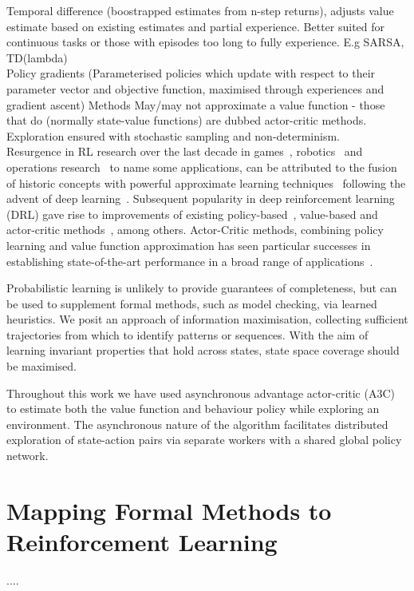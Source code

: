 \documentclass[conference,compsoc]{IEEEtran}
\begin{document}
Temporal difference (boostrapped estimates from n-step returns), adjusts value estimate based on existing estimates and partial experience. Better suited for continuous tasks or those with episodes too long to fully experience. 
E.g SARSA, TD(lambda)\\

Policy gradients (Parameterised policies which update with respect to their parameter vector and objective function, maximised through experiences and gradient ascent)
Methods May/may not approximate a value function - those that do (normally state-value functions) are dubbed actor-critic methods. Exploration ensured with stochastic sampling and non-determinism.\\


Resurgence in RL research over the last decade in games~\cite{schaul2015prioritized, silver2016mastering, vinyals2019grandmaster}, robotics~\cite{gu2017deep, bloesch2022towards} and operations research~\cite{mazyavkina2021reinforcement} to name some applications, can be attributed to the fusion of historic concepts\cite{watkins1992q} with powerful approximate learning techniques~\cite{lecun2015deep} following the advent of deep learning~\cite{mnih2013playing}. Subsequent popularity in deep reinforcement learning (DRL) gave rise to improvements of existing policy-based~\cite{kakade2001natural}, value-based and actor-critic methods~\cite{schulman2017trust}, among others. Actor-Critic methods, combining policy learning and value function approximation has seen particular successes in establishing state-of-the-art performance in a broad range of applications~\cite{schulman2017proximal}. 

Probabilistic learning is unlikely to provide guarantees of completeness, but can be used to supplement formal methods, such as model checking, via learned heuristics. We posit an approach of information maximisation, collecting sufficient trajectories from which to identify patterns or sequences. With the aim of learning invariant properties that hold across states, state space coverage should be maximised. 

Throughout this work we have used asynchronous advantage actor-critic (A3C) to estimate both the value function and behaviour policy while exploring an environment. The asynchronous nature of the algorithm facilitates distributed exploration of state-action pairs via separate workers with a shared global policy network.


\section{Mapping Formal Methods to Reinforcement Learning} \label{sec:mapping_fm_to_ml}
....
\end{document}
